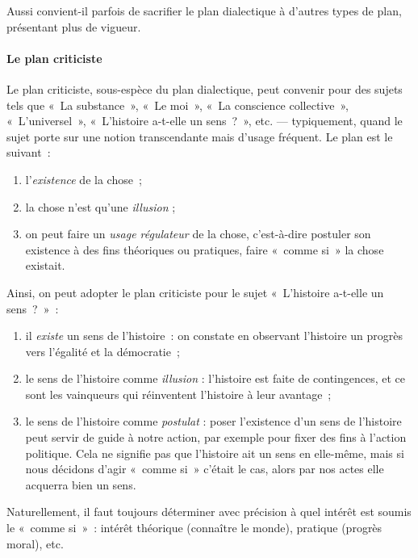 \documentclass[a4paper]{article}
\begin{document}
Aussi convient-il parfois de sacrifier le plan dialectique à d'autres
types de plan, présentant plus de vigueur.

\paragraph{Le plan criticiste}
\label{sec-2-4-2-2}

Le plan criticiste, sous-espèce du plan dialectique, peut convenir pour
des sujets tels que « La substance », « Le moi », « La conscience
collective », « L'universel », « L'histoire a-t-elle un sens ? », etc. ---
typiquement, quand le sujet porte sur une notion transcendante mais
d'usage fréquent. Le plan est le suivant :

\begin{enumerate}
\item l'\emph{existence} de la chose ;

\item la chose n'est qu'une \emph{illusion} ;

\item on peut faire un \emph{usage régulateur} de la chose, c'est-à-dire
postuler son existence à des fins théoriques ou pratiques, faire
« comme si » la chose existait.
\end{enumerate}

Ainsi, on peut adopter le plan criticiste pour le sujet « L'histoire
a-t-elle un sens ? » :

\begin{enumerate}
\item il \emph{existe} un sens de l'histoire : on constate en observant
l'histoire un progrès vers l'égalité et la démocratie ;

\item le sens de l'histoire comme \emph{illusion} : l'histoire est faite de
contingences, et ce sont les vainqueurs qui réinventent l'histoire à
leur avantage ;

\item le sens de l'histoire comme \emph{postulat} : poser l'existence d'un sens
de l'histoire peut servir de guide à notre action, par exemple pour
fixer des fins à l'action politique. Cela ne signifie pas que
l'histoire ait un sens en elle-même, mais si nous décidons d'agir
« comme si » c'était le cas, alors par nos actes elle acquerra bien un
sens.
\end{enumerate}

Naturellement, il faut toujours déterminer avec précision à quel intérêt
est soumis le « comme si » : intérêt théorique (connaître le monde),
pratique (progrès moral), etc.
\end{document}
